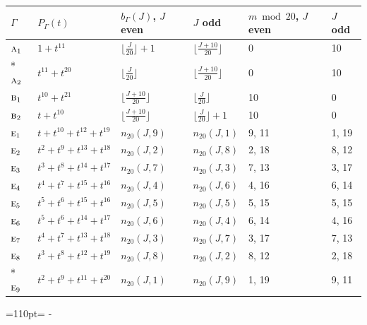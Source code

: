 \documentclass[10pt,a4paper]{article}
\newcommand{\needspace}[1]{\par\penalty-100\begingroup\dimen0=#1\relax\dimen2=\pagegoal
  \advance\dimen2-\pagetotal\ifdim\dimen0>\dimen2\relax\ifdim\dimen2>0pt\vfil\break\fi\fi
  \endgroup}
\numberwithin{equation}{section}
\newcommand{\irr}[1]{\text{\normalfont\scshape #1}}
\begin{document}
{\small{\renewcommand{\arraystretch}{1.3}\begin{longtable}{@{}llllll@{}}\toprule
$\Gamma$ & $P_\Gamma(t)$ & $b_\Gamma(J)$, $J$ even & $J$ odd & $m \bmod 20$, $J$ even & $J$ odd\\\midrule\endhead
\bottomrule\endfoot\endlastfoot
$\irr{a}_{1}$ & $1 + t^{11}$ & $\bigl\lfloor\tfrac{J}{20}\bigr\rfloor + 1$ & $\bigl\lfloor\tfrac{J+10}{20}\bigr\rfloor$ & 0 & 10\\*
$\irr{a}_{2}$ & $t^{11} + t^{20}$ & $\bigl\lfloor\tfrac{J}{20}\bigr\rfloor$ & $\bigl\lfloor\tfrac{J+10}{20}\bigr\rfloor$ & 0 & 10\\
$\irr{b}_{1}$ & $t^{10} + t^{21}$ & $\bigl\lfloor\tfrac{J+10}{20}\bigr\rfloor$ & $\bigl\lfloor\tfrac{J}{20}\bigr\rfloor$ & 10 & 0\\
$\irr{b}_{2}$ & $t + t^{10}$ & $\bigl\lfloor\tfrac{J+10}{20}\bigr\rfloor$ & $\bigl\lfloor\tfrac{J}{20}\bigr\rfloor + 1$ & 10 & 0\\
$\irr{e}_{1}$ & $t + t^{10} + t^{12} + t^{19}$ & $n_{20}(J,9)$ & $n_{20}(J,1)$ & 9, 11 & 1, 19\\
$\irr{e}_{2}$ & $t^{2} + t^{9} + t^{13} + t^{18}$ & $n_{20}(J,2)$ & $n_{20}(J,8)$ & 2, 18 & 8, 12\\
$\irr{e}_{3}$ & $t^{3} + t^{8} + t^{14} + t^{17}$ & $n_{20}(J,7)$ & $n_{20}(J,3)$ & 7, 13 & 3, 17\\
$\irr{e}_{4}$ & $t^{4} + t^{7} + t^{15} + t^{16}$ & $n_{20}(J,4)$ & $n_{20}(J,6)$ & 4, 16 & 6, 14\\
$\irr{e}_{5}$ & $t^{5} + t^{6} + t^{15} + t^{16}$ & $n_{20}(J,5)$ & $n_{20}(J,5)$ & 5, 15 & 5, 15\\
$\irr{e}_{6}$ & $t^{5} + t^{6} + t^{14} + t^{17}$ & $n_{20}(J,6)$ & $n_{20}(J,4)$ & 6, 14 & 4, 16\\
$\irr{e}_{7}$ & $t^{4} + t^{7} + t^{13} + t^{18}$ & $n_{20}(J,3)$ & $n_{20}(J,7)$ & 3, 17 & 7, 13\\
$\irr{e}_{8}$ & $t^{3} + t^{8} + t^{12} + t^{19}$ & $n_{20}(J,8)$ & $n_{20}(J,2)$ & 8, 12 & 2, 18\\*
$\irr{e}_{9}$ & $t^{2} + t^{9} + t^{11} + t^{20}$ & $n_{20}(J,1)$ & $n_{20}(J,9)$ & 1, 19 & 9, 11\\
\bottomrule\end{longtable}}}
\needspace{110pt}
\end{document}
